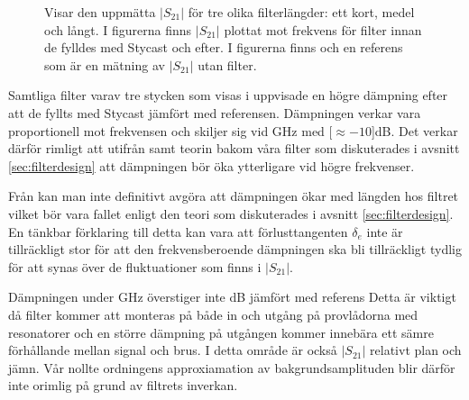 \documentclass[main.tex]{subfiles}
\begin{document}
\begin{figure}[H]
    \begin{subfigure}[t]{0.5\textwidth}
        \centerfloat
        \setlength{}
        \setlength\figureheight{11em}
        
    \end{subfigure}
    \begin{subfigure}[t]{0.5\textwidth}
        \centerfloat
        \setlength{}
        \setlength\figureheight{11em}
        
    \end{subfigure}

    \begin{subfigure}[b]{0.5\textwidth}
        \centering
        \setlength{}
        \setlength\figureheight{11em}
        
    \end{subfigure}
    \caption{Visar den uppmätta $|S_{21}|$ för tre olika filterlängder: ett kort, medel och långt. I figurerna finns $|S_{21}|$ plottat mot frekvens för filter innan de fylldes med Stycast och efter. I figurerna finns och en referens som är en mätning av $|S_{21}|$ utan filter.}
    \label{fig:filter_kar}
\end{figure}

Samtliga filter varav tre stycken som visas i  uppvisade en högre dämpning efter att de fyllts med Stycast jämfört med referensen. Dämpningen verkar vara proportionell mot frekvensen och skiljer sig vid \unit[50]{GHz} med \unit[$\approx-10$]{dB}. Det verkar därför rimligt att utifrån  samt teorin bakom våra filter som diskuterades i avsnitt \ref{sec:filterdesign} att dämpningen bör öka ytterligare vid högre frekvenser.


Från  kan man inte definitivt avgöra att dämpningen ökar med längden hos filtret vilket bör vara fallet enligt den teori som diskuterades i avsnitt \ref{sec:filterdesign}. En tänkbar förklaring till detta kan vara att förlusttangenten $\delta_e$ inte är tillräckligt stor för att den frekvensberoende dämpningen ska bli tillräckligt tydlig för att synas över de fluktuationer som finns i $|S_{21}|$.%

Dämpningen under \unit[10]{GHz} överstiger inte \unit[3]{dB} jämfört med referens Detta är viktigt då filter kommer att monteras på både in och utgång på provlådorna med resonatorer och en större dämpning på utgången kommer innebära ett sämre förhållande mellan signal och brus. I detta område är också $|S_{21}|$ relativt plan och jämn. Vår nollte ordningens approxiamation av bakgrundsamplituden blir därför inte orimlig på grund av filtrets inverkan.
\end{document}
